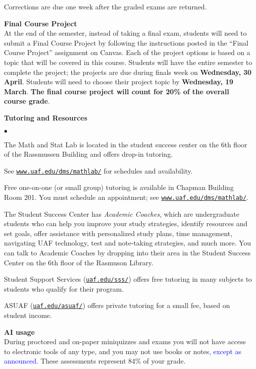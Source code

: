 \documentclass[11pt]{article}
\renewcommand{\emph}[1]{\textsf{\textbf{#1}}}
\newcommand{\localhead}[1]{\par\smallskip\textbf{#1} \smallskip\nobreak\\}%
\def\heading#1{\localhead{\large\emph{#1}}}
\newenvironment{clist}%
{\bgroup\parskip 0pt\begin{list}{$\bullet$}{\partopsep 4pt\topsep 0pt\itemsep -2pt}}%
{\end{list}\egroup}%
\begin{document}
Corrections are due one week after the graded exams are returned.


\heading{Final Course Project}
At the end of the semester, instead of taking a final exam, students will need to submit a Final
Course Project by following the instructions posted in the “Final Course Project” assignment on
Canvas. Each of the project options is based on a topic that will be covered in this course.
Students will have the entire semester to complete the project; the projects are due during finals
week on {\bf Wednesday, 30 April}. Students will need to choose their project topic by
{\bf Wednesday, 19 March}. {\bf The final course project will count for 20\% of the overall course grade}.

\heading{Tutoring and Resources}
\vskip -30pt\strut
\begin{clist}
    \item The Math and Stat Lab is located in the 
      student success center on the 6th floor of the Rassmussen Building and
      offers drop-in tutoring.

	See 	\href{http://www.uaf.edu/dms/mathlab/}{\texttt{www.uaf.edu/dms/mathlab/}} for schedules and availability.
	\item Free
one-on-one (or small group) tutoring is available in 
Chapman Building Room 201. You must schedule an
appointment; see \href{http://www.uaf.edu/dms/mathlab/}{\texttt{www.uaf.edu/dms/mathlab/}}.
\item The Student Success Center has {\it Academic Coaches}, which are undergraduate students who can help you  improve your study strategies, identify resources and set goals, offer assistance with personalized study plans, time management,  navigating UAF technology, test and note-taking strategies, and much more. You can talk to Academic Coaches by dropping into their area in the Student Success Center on the 6th floor of the Rasmuson Library.
	\item Student Support Services (\href{https://uaf.edu/sss/}{\texttt{uaf.edu/sss/}}) offers free tutoring in many subjects to students who qualify for their program.
	\item ASUAF (\href{https://uaf.edu/asuaf/}{\texttt{uaf.edu/asuaf/}}) offers private tutoring for a small fee, based on student income.
\end{clist}



 \heading{AI usage}
During proctored and on-paper miniquizzes and exams you will not have access to electronic tools of any type, and you may not use books or notes\textcolor{blue}{, except as announced}.  These assessments represent 84\% of your grade.
\end{document}
